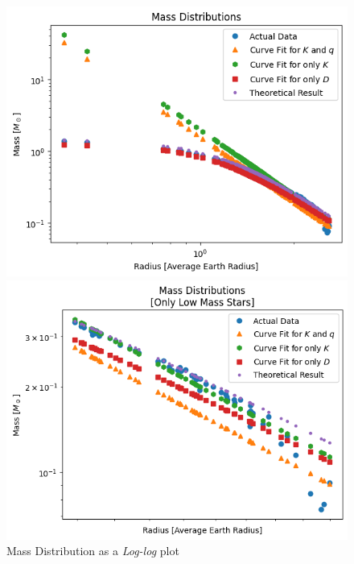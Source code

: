 \documentclass[letterpaper,12pt]{article}
\begin{document}
\begin{figure}[H]
\begin{minipage}{.5\textwidth}
\centerline{\includegraphics[width=\linewidth]{figures/appendix/1_2_7_n_ll_ms_r.png}}
\end{minipage}
\begin{minipage}{.5\textwidth}
\centerline{\includegraphics[width=\linewidth]{figures/appendix/1_2_8_n_ll_ms_r_.png}}
\end{minipage}
\caption{Mass Distribution as a \textit{Log-log} plot}
\end{figure}
\end{document}
